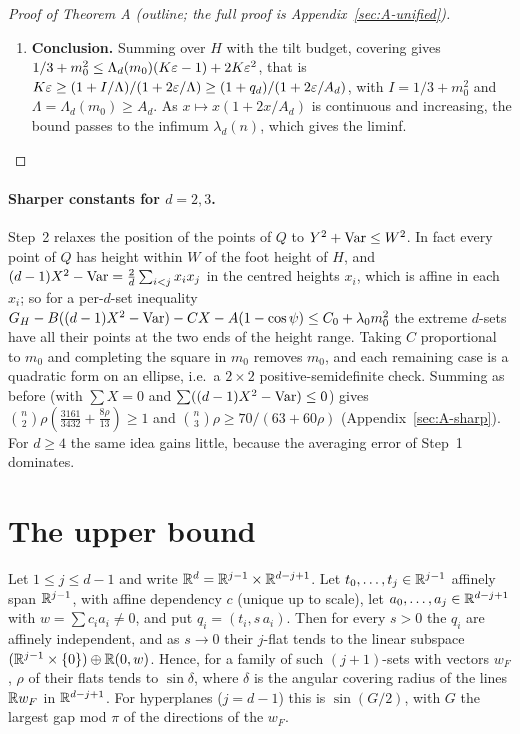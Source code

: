 \documentclass[11pt]{article}
\begin{document}
\begin{proof}[Proof of Theorem A (outline; the full proof is Appendix~\ref{sec:A-unified})]
\begin{enumerate}
$d$-sets. The identity bounds $d\sum X^2$ by $\frac d{d-1}\sum\Var$, both over all $d$-sets, so the $X^2$
terms cancel against the $-\Var$ terms up to $\frac d{d-1}\#\{\text{dependent }d\text{-sets}\}$ (as
$\Var\le1$). With $W^2\le2(1-\cos\psi)$ and the tilt budget, $\sum_HG_H\le A_d(K-1/\eps)$.
\item \textbf{Conclusion.} Summing over $H$ with the tilt budget, covering gives
$1/3+m_0^2\le\Lambda_d(m_0)(K\varepsilon-1)+2K\varepsilon^2$, that is
$K\varepsilon\ge(1+I/\Lambda)/(1+2\varepsilon/\Lambda)\ge(1+q_d)/(1+2\varepsilon/A_d)$, with $I=1/3+m_0^2$ and
$\Lambda=\Lambda_d(m_0)\ge A_d$. As $x\mapsto x(1+2x/A_d)$ is continuous and increasing, the bound
passes to the infimum $\lambda_d(n)$, which gives the liminf.\qedhere
\end{enumerate}
\end{proof}

\paragraph{Sharper constants for $d=2,3$.} Step~2 relaxes the position of the points of $Q$ to
$Y^2+\operatorname{Var}\le W^2$. In fact every point of $Q$ has height within $W$ of the foot height of $H$, and
$(d-1)X^2-\operatorname{Var}=\frac2d\sum_{i<j}x_ix_j$ in the centred heights $x_i$, which is affine in each $x_i$; so
for a per-$d$-set inequality $G_H-B((d-1)X^2-\operatorname{Var})-CX-A(1-\cos\psi)\le C_0+\lambda_0m_0^2$ the
extreme $d$-sets have all their points at the two ends of the height range. Taking $C$ proportional to
$m_0$ and completing the square in $m_0$ removes $m_0$, and each remaining case is a quadratic form on
an ellipse, i.e.\ a $2\times2$ positive-semidefinite check. Summing as before (with $\sum X=0$ and
$\sum((d-1)X^2-\operatorname{Var})\le0$) gives $\binom n2\rho(\frac{3161}{3432}+\frac{8\rho}{13})\ge1$ and
$\binom n3\rho\ge70/(63+60\rho)$ (Appendix~\ref{sec:A-sharp}). For $d\ge4$ the same idea gains little,
because the averaging error of Step~1 dominates.

\section{The upper bound}\label{sec:upper}

\begin{lemTwo}
Let $1\le j\le d-1$ and write $\mathbb{R}^d=\mathbb{R}^{j-1}\times\mathbb{R}^{d-j+1}$. Let $t_0,\dots,t_j\in\mathbb{R}^{j-1}$ affinely
span $\mathbb{R}^{j-1}$, with affine dependency $c$ (unique up to scale), let $a_0,\dots,a_j\in\mathbb{R}^{d-j+1}$ with
$w=\sum c_ia_i\ne0$, and put $q_i=(t_i,s\,a_i)$. Then for every $s>0$ the $q_i$ are affinely
independent, and as $s\to0$ their $j$-flat tends to the linear subspace
$(\mathbb{R}^{j-1}\times\{0\})\oplus\mathbb{R}(0,w)$. Hence, for a family of such $(j+1)$-sets with vectors $w_F$,
$\rho$ of their flats tends to $\sin\delta$, where $\delta$ is the angular covering radius of the lines
$\mathbb{R} w_F$ in $\mathbb{R}^{d-j+1}$. For hyperplanes ($j=d-1$) this is $\sin(G/2)$, with $G$ the largest gap mod
$\pi$ of the directions of the $w_F$.
\end{lemTwo}
\end{document}
